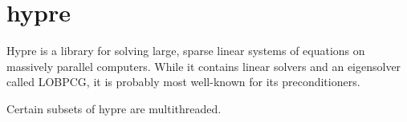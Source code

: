 \section{hypre}
Hypre is a library for solving large, sparse linear systems of equations on
massively parallel computers.  While it contains linear solvers and an
eigensolver called LOBPCG, it is probably most well-known for its
preconditioners.

Certain subsets of hypre are multithreaded.